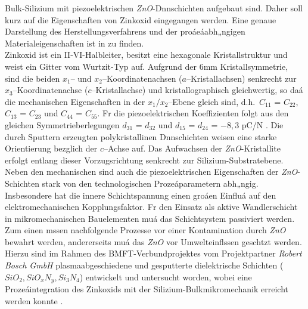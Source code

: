 Bulk-Silizium mit piezoelektrischen {\em ZnO}-Dnnschichten aufgebaut sind.
Daher soll kurz auf die Eigenschaften von Zinkoxid eingegangen werden.
Eine genaue Darstellung des Herstellungsverfahrens und der proáeáabh„ngigen
Materialeigenschaften ist in \cite{Wag94} zu finden. \\
%
Zinkoxid ist ein II-VI-Halbleiter, besitzt eine hexagonale Kristallstruktur
und weist ein Gitter vom Wurtzit-Typ auf. Aufgrund der 6mm Kristallsymmetrie,
sind die beiden $x_{1}$-- und $x_{2}$--Koordinatenachsen
($a$--Kristallachsen) senkrecht zur $x_{3}$--Koordinatenachse
($c$--Kristallachse) und kristallographisch gleichwertig, so daá die
mechanischen Eigenschaften in der $x_{1}/x_{2}$--Ebene gleich sind, d.h.\
$C_{11}$ = $C_{22}$, $C_{13}$ = $C_{23}$ und $C_{44}$ = $C_{55}$.
Fr die piezoelektrischen Koeffizienten folgt aus den gleichen
Symmetrieberlegungen $d_{31}$ = $d_{32}$ und
$d_{15}$ = $d_{24}$ = $-8,3$ pC/N \cite{LB82}. Die durch Sputtern
erzeugten polykristallinen Dnnschichten weisen eine starke Orientierung
bezglich der $c$--Achse auf. Das Aufwachsen der {\em ZnO}-Kristallite
erfolgt entlang dieser Vorzugsrichtung senkrecht zur Silizium-Substratebene.
Neben den mechanischen sind auch die piezoelektrischen Eigenschaften der
{\em ZnO}-Schichten stark von den technologischen Prozeáparametern abh„ngig.
Insbesondere hat die innere Schichtspannung einen groáen Einfluá auf den
elektromechanischen Kopplungsfaktor. Fr den
Einsatz als aktive Wandlerschicht in mikromechanischen Bauelementen muá
das Schichtsystem passiviert werden.  Zum einen mssen nachfolgende
Prozesse vor einer Kontamination durch {\em ZnO} bewahrt werden, andererseits
muá das {\em ZnO} vor Umwelteinflssen geschtzt werden.  Hierzu sind im
Rahmen des BMFT-Verbundprojektes vom Projektpartner {\em Robert Bosch GmbH}
plasmaabgeschiedene und gesputterte dielektrische Schichten ($ SiO_{2},
SiO_{x}N_{y}, Si_{3}N_{4} $) entwickelt und untersucht worden, wobei
eine Prozeáintegration des Zinkoxids mit der Silizium-Bulkmikromechanik
erreicht werden konnte \cite{ABV93}.
